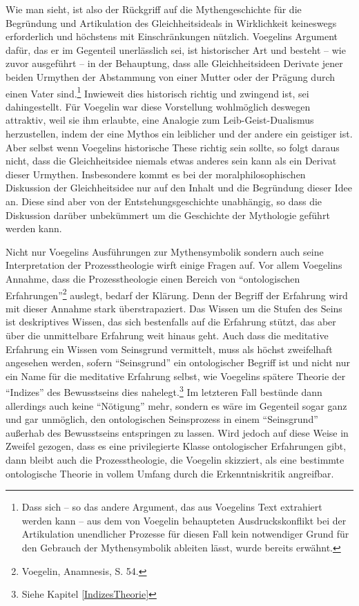 Wie man sieht, ist also der Rückgriff auf die Mythengeschichte für die
Begründung und Artikulation des Gleichheitsideals in Wirklichkeit keineswegs
erforderlich und höchstens mit Einschränkungen nützlich. Voegelins Argument
dafür, das er im Gegenteil unerlässlich sei, ist historischer Art und besteht
-- wie zuvor ausgeführt -- in der Behauptung, dass alle Gleichheitsideen
Derivate jener beiden Urmythen der Abstammung von einer Mutter oder der
Prägung durch einen Vater sind.\footnote{Dass sich -- so das andere Argument,
  das aus Voegelins Text extrahiert werden kann -- aus dem von Voegelin
  behaupteten Ausdruckskonflikt bei der Artikulation unendlicher Prozesse für
  diesen Fall kein notwendiger Grund für den Gebrauch der Mythensymbolik
  ableiten lässt, wurde bereits erwähnt.}  Inwieweit dies historisch richtig
und zwingend ist, sei dahingestellt. Für Voegelin war diese Vorstellung
wohlmöglich deswegen attraktiv, weil sie ihm erlaubte, eine Analogie zum
Leib-Geist-Dualismus herzustellen, indem der eine Mythos ein leiblicher und
der andere ein geistiger ist. Aber selbst wenn Voegelins historische These
richtig sein sollte, so folgt daraus nicht, dass die Gleichheitsidee niemals
etwas anderes sein kann als ein Derivat dieser Urmythen. Insbesondere kommt es
bei der moralphilosophischen Diskussion der Gleichheitsidee nur auf den Inhalt
und die Begründung dieser Idee an. Diese sind aber von der
Entstehungsgeschichte unabhängig, so dass die Diskussion darüber unbekümmert
um die Geschichte der Mythologie geführt werden kann.

Nicht nur Voegelins Ausführungen zur Mythensymbolik sondern auch seine
Interpretation der Prozesstheologie wirft einige Fragen auf. Vor allem
Voegelins Annahme, dass die Prozesstheologie einen Bereich von "`ontologischen
Erfahrungen"'\footnote{Voegelin, Anamnesis, S. 54.}  auslegt, bedarf der
Klärung. Denn der Begriff der Erfahrung wird mit dieser Annahme stark
überstrapaziert. Das Wissen um die Stufen des Seins ist deskriptives Wissen,
das sich bestenfalls auf die Erfahrung stützt, das aber über die unmittelbare
Erfahrung weit hinaus geht. Auch dass die meditative Erfahrung ein Wissen vom
Seinsgrund vermittelt, muss als höchst zweifelhaft angesehen werden, sofern
"`Seinsgrund"' ein ontologischer Begriff ist und nicht nur ein Name für die
meditative Erfahrung selbst, wie Voegelins spätere Theorie der "`Indizes"' des
Bewusstseins dies nahelegt.\footnote{Siehe Kapitel \ref{IndizesTheorie}} Im
letzteren Fall bestünde dann allerdings auch keine "`Nötigung"' mehr, sondern
es wäre im Gegenteil sogar ganz und gar unmöglich, den ontologischen
Seinsprozess in einem "`Seinsgrund"' außerhab des Bewusstseins entspringen zu
lassen. Wird jedoch auf diese Weise in Zweifel gezogen, dass es eine
privilegierte Klasse ontologischer Erfahrungen gibt, dann bleibt auch die
Prozesstheologie, die Voegelin skizziert, als eine bestimmte ontologische
Theorie in vollem Umfang durch die Erkenntniskritik angreifbar.

